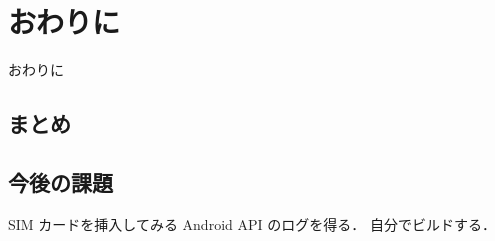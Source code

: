 \section{おわりに}
\label{sec:concl}
おわりに
\subsection{まとめ}

\subsection{今後の課題}
SIM カードを挿入してみる
Android API のログを得る．
自分でビルドする．